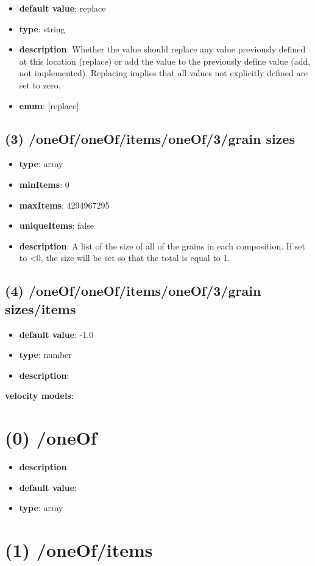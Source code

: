 \begin{itemize}[leftmargin=3em]\item {\bf default value}: replace
\item {\bf type}: string
\item {\bf description}: Whether the value should replace any value previously defined at this location (replace) or add the value to the previously define value (add, not implemented). Replacing implies that all values not explicitly defined are set to zero.
\item {\bf enum}: [replace]\end{itemize}\subsection{(3) /oneOf/oneOf/items/oneOf/3/grain sizes}
\begin{itemize}[leftmargin=3em]\item {\bf type}: array
\item {\bf minItems}: 0
\item {\bf maxItems}: 4294967295
\item {\bf uniqueItems}: false
\item {\bf description}: A list of the size of all of the grains in each composition. If set to <0, the size will be set so that the total is equal to 1.
\end{itemize}\subsection{(4) /oneOf/oneOf/items/oneOf/3/grain sizes/items}
\begin{itemize}[leftmargin=4em]\item {\bf default value}: -1.0
\item {\bf type}: number
\item {\bf description}: 
\end{itemize}\item {\bf velocity models}: \section{(0) /oneOf}
\begin{itemize}[leftmargin=0em]\item {\bf description}: 
\item {\bf default value}: 
\item {\bf type}: array
\end{itemize}\section{(1) /oneOf/items}


